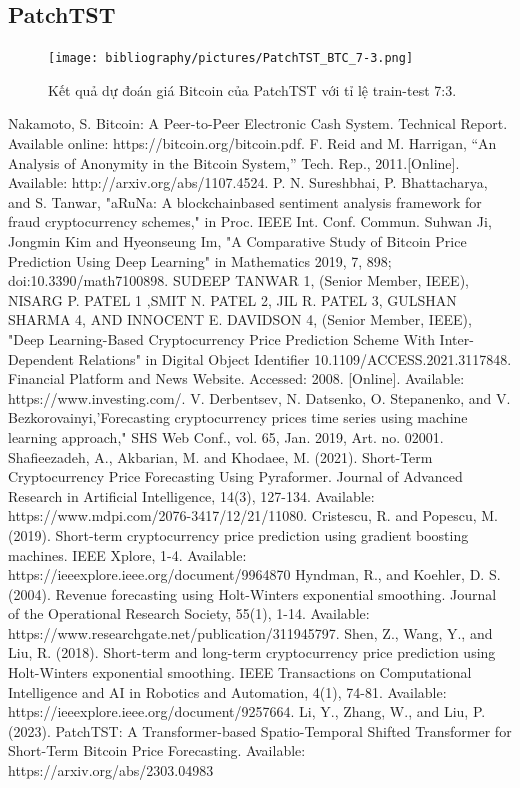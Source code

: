 \documentclass{ieeeojies}
\begin{document}
\subsection{PatchTST}

\begin{figure}[h]
    \centering
    \texttt{[image: bibliography/pictures/PatchTST\_BTC\_7-3.png]}
    \caption{Kết quả dự đoán giá Bitcoin của PatchTST với tỉ lệ train-test 7:3.}
\end{figure}

\begin{thebibliography}{00}
 Nakamoto, S. Bitcoin: A Peer-to-Peer Electronic Cash System. Technical Report. Available online: https://bitcoin.org/bitcoin.pdf.
 F. Reid and M. Harrigan, “An Analysis of Anonymity in the Bitcoin System,” Tech. Rep., 2011.[Online]. Available: http://arxiv.org/abs/1107.4524.
 P. N. Sureshbhai, P. Bhattacharya, and S. Tanwar, "aRuNa: A blockchainbased sentiment analysis framework for fraud cryptocurrency schemes," in Proc. IEEE Int. Conf. Commun. 
 Suhwan Ji, Jongmin Kim and Hyeonseung Im, "A Comparative Study of Bitcoin Price Prediction Using Deep Learning" in Mathematics 2019, 7, 898; doi:10.3390/math7100898.
 SUDEEP TANWAR 1, (Senior Member, IEEE), NISARG P. PATEL 1
,SMIT N. PATEL 2, JIL R. PATEL 3, GULSHAN SHARMA 4, AND INNOCENT E. DAVIDSON 4, (Senior Member, IEEE), "Deep Learning-Based Cryptocurrency
Price Prediction Scheme With Inter-Dependent Relations" in Digital Object Identifier 10.1109/ACCESS.2021.3117848.
 Financial Platform and News Website. Accessed: 2008. [Online]. Available: https://www.investing.com/.
 V. Derbentsev, N. Datsenko, O. Stepanenko, and V. Bezkorovainyi,'Forecasting cryptocurrency prices time series using machine learning approach," SHS Web Conf., vol. 65, Jan. 2019, Art. no. 02001.
 Shafieezadeh, A., Akbarian, M. and Khodaee, M. (2021). Short-Term Cryptocurrency Price Forecasting Using Pyraformer. Journal of Advanced Research in Artificial Intelligence, 14(3), 127-134. Available: https://www.mdpi.com/2076-3417/12/21/11080.
 Cristescu, R. and Popescu, M. (2019). Short-term cryptocurrency price prediction using gradient boosting machines. IEEE Xplore, 1-4. Available: https://ieeexplore.ieee.org/document/9964870
 Hyndman, R., and Koehler, D. S. (2004). Revenue forecasting using Holt-Winters exponential smoothing. Journal of the Operational Research Society, 55(1), 1-14. Available: https://www.researchgate.net/publication/311945797.
 Shen, Z., Wang, Y., and Liu, R. (2018). Short-term and long-term cryptocurrency price prediction using Holt-Winters exponential smoothing. IEEE Transactions on Computational Intelligence and AI in Robotics and Automation, 4(1), 74-81. Available: https://ieeexplore.ieee.org/document/9257664.
 Li, Y., Zhang, W., and Liu, P. (2023). PatchTST: A Transformer-based Spatio-Temporal Shifted Transformer for Short-Term Bitcoin Price Forecasting. Available: https://arxiv.org/abs/2303.04983

\end{thebibliography}


\EOD
\end{document}
